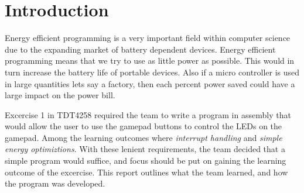 \section{Introduction}
Energy efficient programming is a very important field within computer science due to the expanding market of battery dependent devices.
Energy efficient programming means that we try to use as little power as possible.
This would in turn increase the battery life of portable devices.
Also if a micro controller is used in large quantities lets say a factory, then each percent power saved could have a large impact on the power bill.

Excercise 1 in TDT4258 required the team to write a program in assembly that would allow the user to use the gamepad buttons to control the LEDs on the gamepad.
Among the learning outcomes where \emph{interrupt handling} and \emph{simple energy optimiztions}.
With these lenient requirements, the team decided that a simple program would suffice, and focus should be put on gaining the learning outcome of the excercise.
This report outlines what the team learned, and how the program was developed.
